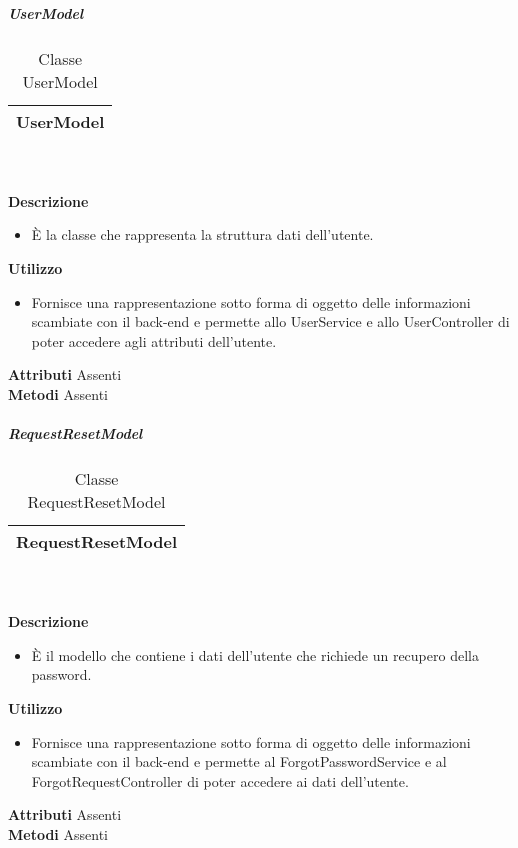 			\subparagraph{UserModel} 
\begin{table}[ht]
\begin{center}
\bgroup
	\setlength{\arrayrulewidth}{0.6mm}
	\def\arraystretch{1}
		\begin{tabular}{ | p{12cm} | }
				\hline  
					\centerline{\textbf{UserModel}}
		\\ \hline 
				\hline
				\hline
		
		\end{tabular}
\egroup
\caption{Classe UserModel}
\end{center}
\end{table} \textbf{\\ \\ Descrizione}
\begin{itemize}
\item[] È la classe che rappresenta la struttura dati dell'utente.
\end{itemize} 
\textbf{Utilizzo}
\begin{itemize}
\item[] Fornisce una rappresentazione sotto forma di oggetto delle informazioni scambiate con il back-end e permette allo UserService e allo UserController di poter accedere agli attributi dell'utente.
\end{itemize}
\textbf{Attributi}
Assenti \\
\textbf{Metodi}
Assenti \\

			\subparagraph{RequestResetModel} 
\begin{table}[ht]
\begin{center}
\bgroup
	\setlength{\arrayrulewidth}{0.6mm}
	\def\arraystretch{1}
		\begin{tabular}{ | p{12cm} | }
				\hline  
					\centerline{\textbf{RequestResetModel}}
		\\ \hline 
				\hline
				\hline
		
		\end{tabular}
\egroup
\caption{Classe RequestResetModel}
\end{center}
\end{table} \textbf{\\ \\ Descrizione}
\begin{itemize}
\item[] È il modello che contiene i dati dell'utente che richiede un recupero della password.
\end{itemize} 
\textbf{Utilizzo}
\begin{itemize}
\item[] Fornisce una rappresentazione sotto forma di oggetto delle informazioni scambiate con il back-end e permette al ForgotPasswordService e al ForgotRequestController di poter accedere ai dati dell'utente.
\end{itemize}
\textbf{Attributi}
Assenti \\
\textbf{Metodi}
Assenti \\

